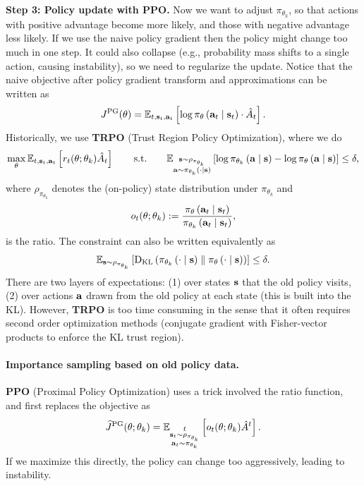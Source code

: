 \documentclass[11pt]{article}  %
\begin{document}
\textbf{Step 3: Policy update with PPO.} Now we want to adjust $\pi_{\theta_k}$, so that actions with positive advantage become more likely, and those with negative advantage less likely.
If we use the naive policy gradient then the policy might change too much in one step.
It could also collapse (e.g., probability mass shifts to a single action, causing instability), so we need to regularize the update.
Notice that the naive objective after policy gradient transform and approximations can be written as 
\begin{align*}
  J^{\text{PG}}(\theta) = \mathbb{E}_{t, \mathbf{s}_t, \mathbf{a}_t}\left[\log \pi_{\theta}\left( \mathbf{a}_t \mid \mathbf{s}_t \right)\cdot \hat{A}_t\right].
\end{align*}
Historically, we use \textbf{TRPO} (Trust Region Policy Optimization), where we do 
\begin{align*}
  \max_{\theta} \mathbb{E}_{t, \mathbf{s}_t, \mathbf{a}_t}\left[r_t(\theta; 
  \theta_k) \hat{A}_t\right] \qquad \text{s.t.} \qquad \mathbb{E}_{\substack{\mathbf{s} \sim \rho_{\pi_{\theta_{k}}} \\ \mathbf{a} \sim \pi_{\theta_{k}}\left( \cdot \mid \mathbf{s} \right)}}\left[\log\pi_{\theta_k}\left( \mathbf{a} \mid \mathbf{s} \right) - \log\pi_{\theta}\left( \mathbf{a} \mid \mathbf{s} \right)\right] \leq \delta,
\end{align*}
where $\rho_{\pi_{\theta_{k}}}$ denotes the (on-policy) state distribution under $\pi_{\theta_{k}}$ and 
\begin{align*}
  o_t(\theta; \theta_k) := \frac{\pi_{\theta}\left( \mathbf{a}_t \mid \mathbf{s}_t \right)}{\pi_{\theta_{k}}\left( \mathbf{a}_t \mid \mathbf{s}_t \right)},
\end{align*}
is the ratio.
The constraint can also be written equivalently as 
\begin{align*}
  \mathbb{E}_{\mathbf{s} \sim \rho_{\pi_{\theta_k}} }\left[{\rm D}_{\text{KL}}\left( \pi_{\theta_{k}}\left( \cdot \mid \mathbf{s} \right) \parallel \pi_{\theta}\left( \cdot \mid \mathbf{s} \right) \right)\right] \leq \delta.
\end{align*}
There are two layers of expectations: (1) over states $\mathbf{s}$ that the old policy visits, (2) over actions $\mathbf{a}$ drawn from the old policy at each state (this is built into the KL).
However, \textbf{TRPO} is too time consuming in the sense that it often requires second order optimization methods (conjugate gradient with Fisher-vector products to enforce the KL trust region).


\paragraph{Importance sampling based on old policy data.} \textbf{PPO} (Proximal Policy Optimization) uses a trick involved the ratio function, and first replaces the objective as 
\begin{align*}
  \widehat{J}^{\text{PG}}(\theta; \theta_k) = \mathbb{E}_{ \substack{t \\ \mathbf{s}_t \sim \rho_{\pi_{\theta_k}} \\ \mathbf{a}_t \sim \pi_{\theta_k}}}\left[o_t(\theta; \theta_k) \hat{A}^t\right].
\end{align*} 
If we maximize this directly, the policy can change too aggressively, leading to instability.
\end{document}
